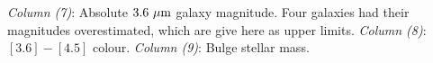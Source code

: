 \begin{table*}
\begin{center}
{\emph{Column (7)}: Absolute $3.6\rm~\mu m$ galaxy magnitude. 			Four galaxies had their magnitudes overestimated, which are give here as upper limits. 
\emph{Column (8)}: $[3.6]-[4.5]$ colour. 
\emph{Column (9)}: Bulge stellar mass. } 
\end{center}    
\end{table*}    
